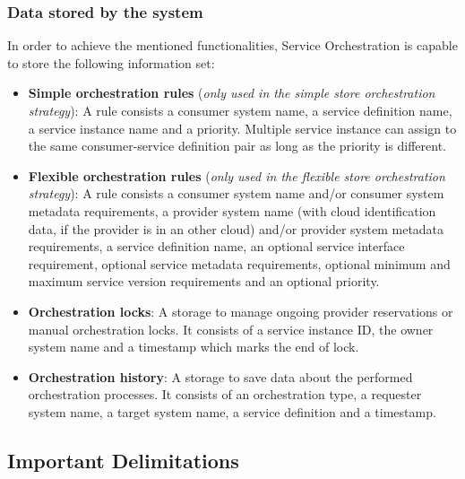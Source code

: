 \documentclass[a4paper]{arrowhead}
\begin{document}
\subsubsection {Data stored by the system}
In order to achieve the mentioned functionalities, Service Orchestration is capable to store the following information set:

\begin{itemize}
    \item \textbf{Simple orchestration rules} (\textit{only used in the simple store orchestration strategy}): A rule consists a consumer system name, a service definition name, a service instance name and a priority. Multiple service instance can assign to the same consumer-service definition pair as long as the priority is different.
    \item \textbf{Flexible orchestration rules} (\textit{only used in the flexible store orchestration strategy}): A rule consists a consumer system name and/or consumer system metadata requirements, a provider system name (with cloud identification data, if the provider is in an other cloud) and/or provider system metadata requirements, a service definition name, an optional service interface requirement, optional service metadata requirements, optional minimum and maximum service version requirements and an optional priority.
    \item \textbf{Orchestration locks}: A storage to manage ongoing provider reservations or manual orchestration locks. It consists of a service instance ID, the owner system name and a timestamp which marks the end of lock.
    \item \textbf{Orchestration history}: A storage to save data about the performed orchestration processes. It consists of an orchestration type, a requester system name, a target system name, a service definition and a timestamp.
\end{itemize}

\subsection{Important Delimitations}
\label{sec:delimitations}
\end{document}
